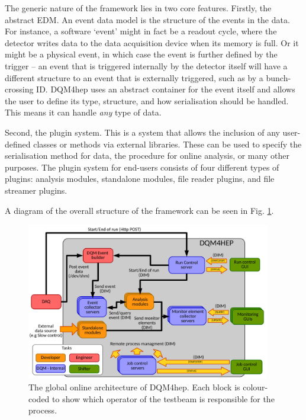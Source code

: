 The generic nature of the framework lies in two core features. Firstly, the abstract \acrfull{EDM}. An event data model is the structure of the events in the data. For instance, a software `event' might in fact be a readout cycle, where the detector writes data to the data acquisition device when its memory is full. Or it might be a physical event, in which case the event is further defined by the trigger -- an event that is triggered internally by the detector itself will have a different structure to an event that is externally triggered, such as by a bunch-crossing ID. \acrshort{DQM4hep} uses an abstract container for the event itself and allows the user to define its type, structure, and how serialisation should be handled. This means it can handle \textit{any} type of data.

Second, the plugin system. This is a system that allows the inclusion of any user-defined classes or methods via external libraries. These can be used to specify the serialisation method for data, the procedure for online analysis, or many other purposes. The plugin system for end-users consists of four different types of plugins: analysis modules, standalone modules, file reader plugins, and file streamer plugins.

A diagram of the overall structure of the framework can be seen in Fig. \ref{figure:daq/dqm4hep/architecture}.

\begin{figure}[p]
	\centering
	\includegraphics[width=0.95\textwidth]{../Pictures/GlobalArchitectureDiagram.pdf}
	\caption{The global online architecture of \acrshort{DQM4hep}. Each block is colour-coded to show which operator of the testbeam is responsible for the process.}
	\label{figure:daq/dqm4hep/architecture}
\end{figure}

